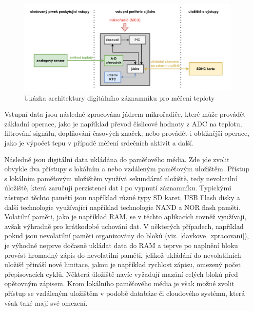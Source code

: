 \begin{figure}[h]
    \centering
    \includegraphics[width=1.00\textwidth]{obrazky-figures/recorder_mcu.pdf}
    
    \caption{Ukázka architektury digitálního záznamníku pro měření teploty}
    \label{fig:mcu-recorder}
\end{figure}

Vstupní data jsou následně zpracována jádrem mikrořadiče, které může provádět základní operace, jako je například převod číslicové hodnoty z ADC na teplotu, filtrování signálu, doplňování časových značek, nebo provádět i obtížnější operace, jako je výpočet tepu v případě měření srdečních aktivit a další.

Následně jsou digitální data ukládána do paměťového média. Zde jde zvolit obvykle dva přístupy s lokálním a nebo vzdáleným paměťovým uložištěm. Přístup s lokálním paměťovým uložištěm využívá sekundární uložiště, tedy nevolatilní úložiště, která zaručují perzistenci dat i po vypnutí záznamníku. Typickými zástupci těchto pamětí jsou například různé typy SD karet, USB Flash disky a další technologie využívající například technologie NAND a NOR flash paměti. Volatilní paměti, jako je například RAM, se v těchto aplikacích rovněž využívají, avšak výhradně pro krátkodobé uchování dat. V některých případech, například pokud jsou nevolatilní paměti organizovány do bloků (viz. \ref{davkove_zpracovani}), je výhodné nejprve dočasně ukládat data do RAM a teprve po naplnění bloku provést hromadný zápis do nevolatilní paměti, jelikož ukládání do nevolatilních uložišť přináší nové limitace, jakou je například rychlost zápisu,  omezený počet přepisovacích cyklů. Některá úložiště navíc vyžadují mazání celých bloků před opětovným zápisem. Krom lokálního paměťového média je však možné zvolit přístup se vzdáleným uložištěm v podobě databáze či cloudového systému, která však také mají své omezení.


